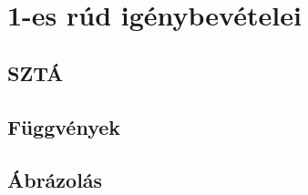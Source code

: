 \section{1-es rúd igénybevételei}
\subsection{SZTÁ}

\newpage

\subsection{Függvények}

\newpage

\subsection{Ábrázolás}
